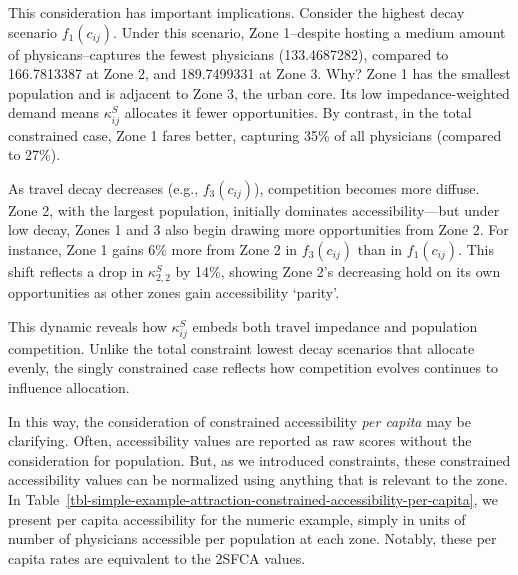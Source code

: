 \documentclass[
  10pt,
  letterpaper,
]{article}
\begin{document}
This consideration has important implications. Consider the highest
decay scenario \(f_1(c_{ij})\). Under this scenario, Zone 1--despite
hosting a medium amount of physicans--captures the fewest physicians
(133.4687282), compared to 166.7813387 at Zone 2, and 189.7499331 at
Zone 3. Why? Zone 1 has the smallest population and is adjacent to Zone
3, the urban core. Its low impedance-weighted demand means
\(\kappa^S_{ij}\) allocates it fewer opportunities. By contrast, in the
total constrained case, Zone 1 fares better, capturing 35\% of all
physicians (compared to 27\%).

As travel decay decreases (e.g., \(f_3(c_{ij})\)), competition becomes
more diffuse. Zone 2, with the largest population, initially dominates
accessibility---but under low decay, Zones 1 and 3 also begin drawing
more opportunities from Zone 2. For instance, Zone 1 gains 6\% more from
Zone 2 in \(f_3(c_{ij})\) than in \(f_1(c_{ij})\). This shift reflects a
drop in \(\kappa^S_{2,2}\) by 14\%, showing Zone 2's decreasing hold on
its own opportunities as other zones gain accessibility `parity'.

This dynamic reveals how \(\kappa^S_{ij}\) embeds both travel impedance
and population competition. Unlike the total constraint lowest decay
scenarios that allocate evenly, the singly constrained case reflects how
competition evolves continues to influence allocation.

In this way, the consideration of constrained accessibility \emph{per
capita} may be clarifying. Often, accessibility values are reported as
raw scores without the consideration for population. But, as we
introduced constraints, these constrained accessibility values can be
normalized using anything that is relevant to the zone. In
Table~\ref{tbl-simple-example-attraction-constrained-accessibility-per-capita},
we present per capita accessibility for the numeric example, simply in
units of number of physicians accessible per population at each zone.
Notably, these per capita rates are equivalent to the 2SFCA values.
\end{document}
